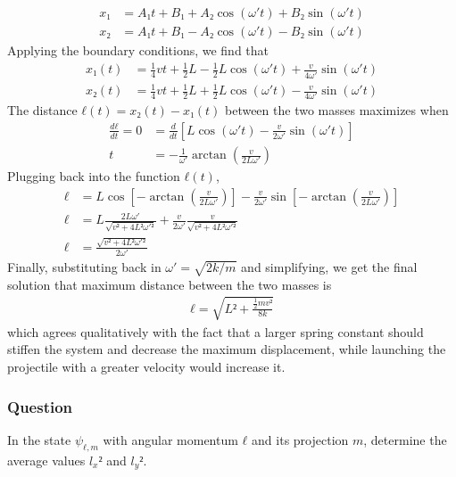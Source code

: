 \begin{align*}
    x₁ &= A₁t + B₁ + A₂\cos(ω't) + B₂\sin(ω't) \\
    x₂ &= A₁t + B₁ - A₂\cos(ω't) - B₂\sin(ω't)
\end{align*}
Applying the boundary conditions, we find that
\begin{align*}
    x₁(t) &= \frac 14 vt + \frac 12 L - \frac 12 L\cos(ω't) +
	\frac{v}{4ω'}\sin(ω't) \\
    x₂(t) &= \frac 14 vt + \frac 12 L + \frac 12 L\cos(ω't) -
	\frac{v}{4ω'}\sin(ω't)
\end{align*}
The distance $ℓ(t) = x₂(t) - x₁(t)$ between the two masses maximizes when
\begin{align*}
    \frac{dℓ}{dt} = 0 &= \frac{d}{dt} \left[ L\cos(ω't) -
	\frac{v}{2ω'}\sin(ω't) \right] \\
    t &= -\frac{1}{ω'} \arctan (\frac{v}{2Lω'})
\end{align*}
Plugging back into the function $ℓ(t)$,
\begin{align*}
    ℓ &= L\cos \left[ -\arctan (\frac{v}{2Lω'}) \right] - \frac{v}{2ω'}
	\sin \left[ -\arctan (\frac{v}{2Lω'}) \right] \\
    ℓ &= L \frac{2Lω'}{\sqrt{v² + 4L² {ω'}²}} + \frac{v}{2ω'}
	\frac{v}{\sqrt{v² + 4L² {ω'}²}} \\
    ℓ &= \frac{\sqrt{v² + 4L² {ω'}²}}{2ω'}
\end{align*}
Finally, substituting back in $ω' = \sqrt{2k/m}$ and simplifying, we get the
final solution that maximum distance between the two masses is
\begin{align}
    \boxed{
    ℓ = \sqrt{L² + \frac{\frac 12 mv²}{8k}}
    }
\end{align}
which agrees qualitatively with the fact that a larger spring constant should
stiffen the system and decrease the maximum displacement, while launching the
projectile with a greater velocity would increase it.

\subsubsection{Question}

In the state $ψ_{ℓ,m}$ with angular momentum $ℓ$ and its projection $m$,
determine the average values ${l_x}²$ and ${l_y}²$.

